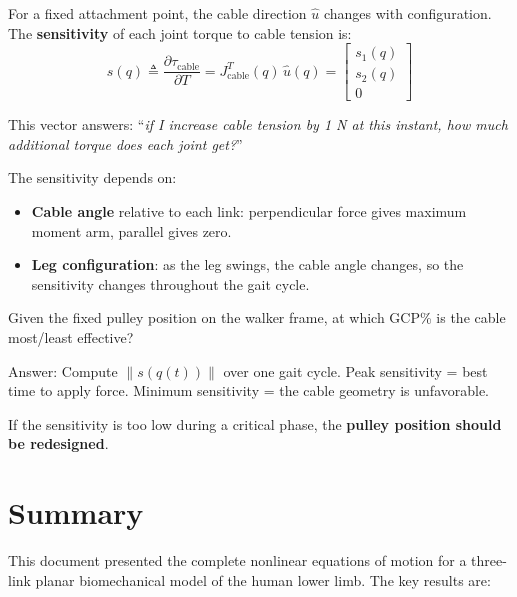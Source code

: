 \documentclass[11pt,a4paper]{article}
\newcommand{\vc}[1]{\bm{#1}}
\def\vc#1{#1}%
\def\bm#1{#1}%
\begin{document}
For a fixed attachment point, the cable direction $\hat{\vc{u}}$ changes
with configuration. The \textbf{sensitivity} of each joint torque to
cable tension is:
\begin{equation}
    \vc{s}(\vc{q}) \triangleq \frac{\partial \vc{\tau}_{\text{cable}}}{\partial T}
    = \vc{J}_{\text{cable}}^T(\vc{q}) \, \hat{\vc{u}}(\vc{q})
    = \begin{bmatrix} s_1(\vc{q}) \\ s_2(\vc{q}) \\ 0 \end{bmatrix}
    \label{eq:sensitivity}
\end{equation}

This vector answers: ``\textit{if I increase cable tension by 1 N at this
instant, how much additional torque does each joint get?}''

The sensitivity depends on:
\begin{itemize}
    \item \textbf{Cable angle} relative to each link: perpendicular force
          gives maximum moment arm, parallel gives zero.
    \item \textbf{Leg configuration}: as the leg swings, the cable angle
          changes, so the sensitivity changes throughout the gait cycle.
\end{itemize}

\begin{resultbox}
Given the fixed pulley position on the walker frame, at which GCP\% is
the cable most/least effective?

Answer: Compute $\|\vc{s}(\vc{q}(t))\|$ over one gait cycle.
Peak sensitivity = best time to apply force.
Minimum sensitivity = the cable geometry is unfavorable.

If the sensitivity is too low during a critical phase, the
\textbf{pulley position should be redesigned}.
\end{resultbox}

\section{Summary}

This document presented the complete nonlinear equations of motion for a
three-link planar biomechanical model of the human lower limb. The key
results are:
\end{document}
